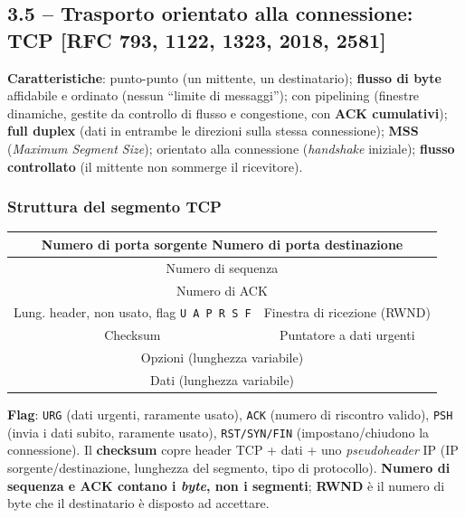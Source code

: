 \documentclass[12pt, a4paper]{article}
\begin{document}
\subsection{3.5 -- Trasporto orientato alla connessione: TCP [RFC 793, 1122, 1323, 2018, 2581]}

\textbf{Caratteristiche}: punto-punto (un mittente, un destinatario); \textbf{flusso di byte} affidabile e ordinato (nessun ``limite di messaggi''); con pipelining (finestre dinamiche, gestite da controllo di flusso e congestione, con \textbf{ACK cumulativi}); \textbf{full duplex} (dati in entrambe le direzioni sulla stessa connessione); \textbf{MSS} (\textit{Maximum Segment Size}); orientato alla connessione (\textit{handshake} iniziale); \textbf{flusso controllato} (il mittente non sommerge il ricevitore).

\subsubsection{Struttura del segmento TCP}

\begin{table}[H]
\centering
\small
\begin{tabular}{|c|c|}
\hline
\multicolumn{2}{|c|}{Numero di porta sorgente \hfill Numero di porta destinazione} \\
\hline
\multicolumn{2}{|c|}{Numero di sequenza} \\
\hline
\multicolumn{2}{|c|}{Numero di ACK} \\
\hline
Lung. header, non usato, flag \texttt{U A P R S F} & Finestra di ricezione (RWND) \\
\hline
Checksum & Puntatore a dati urgenti \\
\hline
\multicolumn{2}{|c|}{Opzioni (lunghezza variabile)} \\
\hline
\multicolumn{2}{|c|}{Dati (lunghezza variabile)} \\
\hline
\end{tabular}
\end{table}

\textbf{Flag}: \texttt{URG} (dati urgenti, raramente usato), \texttt{ACK} (numero di riscontro valido), \texttt{PSH} (invia i dati subito, raramente usato), \texttt{RST/SYN/FIN} (impostano/chiudono la connessione). Il \textbf{checksum} copre header TCP + dati + uno \textit{pseudoheader} IP (IP sorgente/destinazione, lunghezza del segmento, tipo di protocollo). \textbf{Numero di sequenza e ACK contano i \textit{byte}, non i segmenti}; \textbf{RWND} è il numero di byte che il destinatario è disposto ad accettare.
\end{document}
